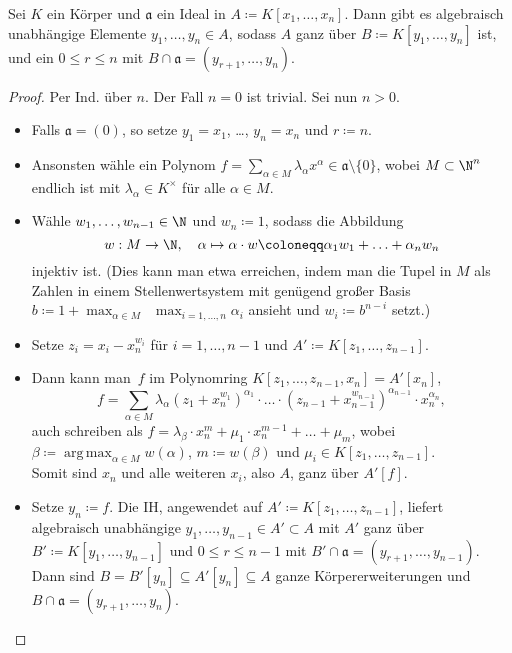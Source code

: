 \documentclass{cheat-sheet}
\DeclareMathOperator*{\argmax}{arg\,max}
\newcommand{\aaa}{\mathfrak{a}}
\begin{document}
\begin{prop}
  Sei $K$ ein Körper und $\aaa$ ein Ideal in $A \coloneqq K[x_1, \ldots, x_n]$.
  Dann gibt es algebraisch unabhängige Elemente $y_1, \ldots, y_n \in A$, sodass $A$ ganz über $B \coloneqq K[y_1, \ldots, y_n]$ ist, und ein $0 \leq r \leq n$ mit $B \cap \aaa = (y_{r+1}, \ldots, y_n)$.
\end{prop}

\begin{proof}
  Per Ind. über $n$. Der Fall $n=0$ ist trivial. Sei nun $n > 0$.
  \begin{itemize}
    \item Falls $\aaa = (0)$, so setze $y_1 = x_1$, \ldots, $y_n = x_n$ und $r \coloneqq n$.
    \item Ansonsten wähle ein Polynom $f = \sum_{\alpha \in M} \lambda_\alpha x^\alpha \in \aaa \setminus \{ 0 \}$, wobei $M \subset \N^n$ endlich ist mit $\lambda_\alpha \in K^{\times}$ für alle $\alpha \in M$.
    \item Wähle $w_1, \ldots, w_{n-1} \in \N$ und $w_n \coloneqq 1$, sodass die Abbildung
    \[
      w : M \to \N, \quad
      \alpha \mapsto \alpha \cdot w \coloneqq \alpha_1 w_1 + \ldots + \alpha_n w_n
    \]
    injektiv ist.
    (Dies kann man etwa erreichen, indem man die Tupel in $M$ als Zahlen in einem Stellenwertsystem mit genügend großer Basis $b \coloneqq 1 + \max_{\alpha \in M} \enspace \max_{i = 1, \ldots, n} \alpha_i$ ansieht und $w_i \coloneqq b^{n-i}$ setzt.)
    \item Setze $z_i = x_i - x_n^{w_i}$ für $i = 1, \ldots, n-1$ und $A' \coloneqq K[z_1, \ldots, z_{n-1}]$.
    \item Dann kann man~$f$ im Polynomring $K[z_1, \ldots, z_{n-1}, x_n] = A'[x_n]$,
    \[
      f = {\sum}_{\alpha \in M} \lambda_\alpha (z_1 + x_n^{w_1})^{\alpha_1} \cdot \ldots \cdot (z_{n-1} + x_{n-1}^{w_{n-1}})^{\alpha_{n-1}} \cdot x_n^{\alpha_n},
    \]
     auch schreiben als $f = \lambda_\beta \cdot x_n^{m} + \mu_1 \cdot x_n^{m - 1} + \ldots + \mu_{m}$, wobei $\beta \coloneqq {\argmax}_{\alpha \in M} w(\alpha)$, $m \coloneqq w(\beta)$ und $\mu_i \in K[z_1, \ldots, z_{n-1}]$. \\
     Somit sind $x_n$ und alle weiteren $x_i$, also $A$, ganz über $A'[f]$.
     \item Setze $y_n \coloneqq f$.
     Die IH, angewendet auf $A' \coloneqq K[z_1, \ldots, z_{n-1}]$, liefert algebraisch unabhängige $y_1, \ldots, y_{n-1} \in A' \subset A$ mit $A'$ ganz über $B' \coloneqq K[y_1, \ldots, y_{n-1}]$ und $0 \leq r \leq n-1$ mit $B' \cap \aaa = (y_{r+1}, \ldots, y_{n-1})$.
     Dann sind $B = B'[y_n] \subseteq A'[y_n] \subseteq A$ ganze Körpererweiterungen und $B \cap \aaa = (y_{r+1}, \ldots, y_n)$. \qedhere
  \end{itemize}
\end{proof}
\end{document}
